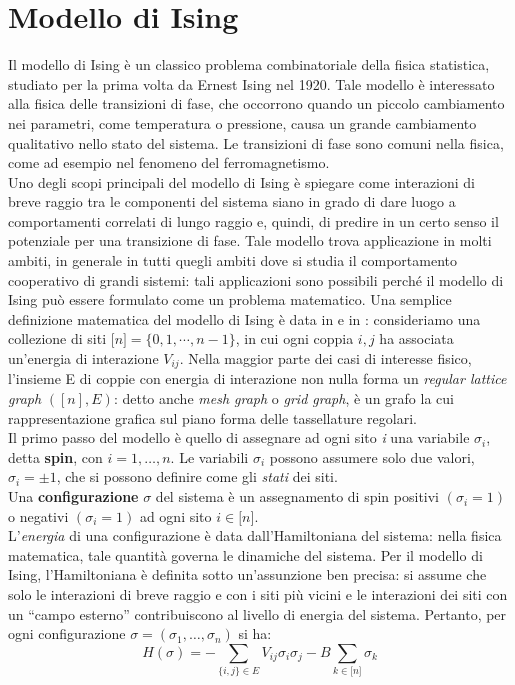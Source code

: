 \section{Modello di Ising}
Il modello di Ising è un classico problema combinatoriale della fisica statistica, studiato per la prima volta da Ernest Ising nel 1920. Tale modello è interessato alla fisica delle transizioni di fase, che occorrono quando un piccolo cambiamento nei parametri, come temperatura o pressione, causa un grande cambiamento qualitativo nello stato del sistema. Le transizioni di fase sono comuni nella fisica, come ad esempio nel fenomeno del ferromagnetismo.\\
Uno degli scopi principali del modello di Ising è spiegare come interazioni di breve raggio tra le componenti del sistema siano in grado di dare luogo a comportamenti correlati di lungo raggio e, quindi, di predire in un certo senso il potenziale per una transizione di fase. Tale modello trova applicazione in molti ambiti, in generale in tutti quegli ambiti dove si studia il comportamento cooperativo di grandi sistemi: tali applicazioni sono possibili perché il modello di Ising può essere formulato come un problema matematico. Una semplice definizione matematica del modello di Ising è data in \cite{cipra1987introduction} e in \cite{jerrum1993polynomial}: consideriamo una collezione di siti $\lbrack n \rbrack = \lbrace 0, 1, \cdots, n-1 \rbrace$, in cui ogni coppia $i, j$ ha associata un’energia di interazione $V_{ij}$. Nella maggior parte dei casi di interesse fisico, l’insieme E di coppie con energia di interazione non nulla forma un \textit{regular lattice graph} $([n], E)$: detto anche \textit{mesh graph} o \textit{grid graph}, è un grafo la cui rappresentazione grafica sul piano forma delle tassellature regolari.\\
Il primo passo del modello è quello di assegnare ad ogni sito \textit{i} una variabile $\sigma_i$, detta \textbf{spin}, con $i=1, \dots, n$. Le variabili $\sigma_i$ possono assumere solo due valori, $\sigma_i = \pm 1$, che si possono definire come gli \textit{stati} dei siti.\\
Una \textbf{configurazione} $\sigma$ del sistema è un assegnamento di spin positivi $\left( \sigma_i = 1 \right)$ o negativi $\left( \sigma_i = 1 \right)$ ad ogni sito $i \in \lbrack n \rbrack$.\\
L'\textit{energia} di una configurazione è data dall’Hamiltoniana del sistema: nella fisica matematica, tale quantità governa le dinamiche del sistema. Per il modello di Ising, l’Hamiltoniana è definita sotto un’assunzione ben precisa: si assume che solo le interazioni di breve raggio e con i siti più vicini e le interazioni dei siti con un ``campo esterno'' contribuiscono al livello di energia del sistema. Pertanto, per ogni configurazione $\sigma = (\sigma_1, \dots, \sigma_n)$ si ha:\\
\begin{equation}
H(\sigma) = - \sum_{\lbrace i,j \rbrace \in E}{V_{ij}\sigma_i\sigma_j} - B \sum_{k\in\lbrack n \rbrack}{\sigma_k}
\end{equation}

